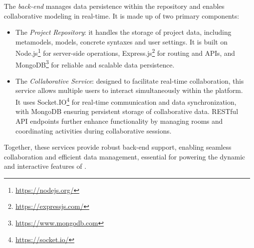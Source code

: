 \medskip
\noindent
The \textit{back-end} manages data persistence within the \jjodel{} repository and enables collaborative modeling in real-time. It is made up of two primary components:
\begin{itemize}
    \item The \textit{\jjodel{} Project Repository}: it handles the storage of project data, including metamodels, models, concrete syntaxes and user settings. It is built on Node.js\footnote{\url{https://nodejs.org/}} for server-side operations, Express.js\footnote{\url{https://expressjs.com/}} for routing and APIs, and MongoDB\footnote{\url{https://www.mongodb.com}} for reliable and scalable data persistence.
	\item The \textit{\jjodel{} Collaborative Service}: designed to facilitate real-time collaboration, this service allows multiple users to interact simultaneously within the platform. It uses Socket.IO\footnote{\url{https://socket.io/}} for real-time communication and data synchronization, with MongoDB ensuring persistent storage of collaborative data. RESTful API endpoints further enhance functionality by managing rooms and coordinating activities during collaborative sessions.
\end{itemize}

Together, these services provide robust back-end support, enabling seamless collaboration and efficient data management, essential for powering the dynamic and interactive features of \jjodel{}.


